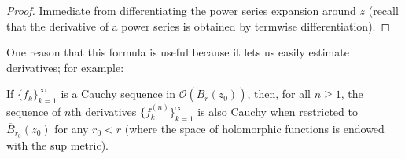 \documentclass[10pt]{article}
\providecommand{\ol}{\overline}
\providecommand{\dd}{\mathrm d}
\providecommand{\CC}{\mathbb C}
\begin{document}
\begin{proof}
    Immediate from differentiating the power series expansion around $z$
    (recall that the derivative of a power series
    is obtained by termwise differentiation).
\end{proof}

% 

One reason that this formula is useful because it
lets us easily estimate derivatives; for example:

\begin{lemma}
    \label{lem:derivative-of-cauchy-seq}
    If $\{f_k\}_{k=1}^\infty$ is a Cauchy sequence
    in $\mathcal O(\ol B_r(z_0))$, then, for all $n\ge 1$,
    the sequence of $n$th derivatives $\{f_k^{(n)}\}_{k=1}^\infty$
    is also Cauchy when restricted to $\ol B_{r_0}(z_0)$
    for any $r_0 < r$ (where the space of holomorphic functions
    is endowed with the sup metric).
\end{lemma}
\end{document}
